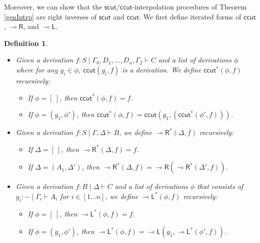\documentclass[sn-mathphys-num]{sn-jnl}%
\newcommand{\GG}{\Gamma}
\newcommand{\GD}{\Delta}
\newcommand{\vd}{\vdash}
\newcommand{\lolli}{\multimap}
\newcommand{\lleft}{{\lolli}\mathsf{L}}
\newcommand{\lright}{{\lolli}\mathsf{R}}
\newcommand{\sls}{\slash}
\newcommand{\mf}[1]{\mathsf{#1}}
\theoremstyle{thmstyleone}%
\theoremstyle{thmstyletwo}%
\theoremstyle{thmstylethree}%
\newtheorem{definition}[theorem]{Definition}%
\begin{document}
Moreover, we can show that the $\mf{scut}\sls \mf{ccut}$-interpolation procedures of Theorem \ref{genIntrp} are right inverses of $\mf{scut}$ and $\mf{ccut}$.
We first define iterated forms of $\mf{ccut}$, $\lright$, and $\lleft$.
\begin{definition}
~
\begin{itemize}
  \item  Given a derivation $f : S \mid \GG_0 , D_1 , \dots, D_n , \GG_2 \vd C$ and a list of derivations $\phi$ where for any $g_i \in \phi$, $\mf{ccut}(g_i , f)$ is a derivation. 
  We define $\mf{ccut}^* (\phi , f)$ recursively:
  \begin{itemize}
    \item[--] If $\phi = [\ ]$, then $\mf{ccut}^* (\phi , f) = f$.
    \item[--] If $\phi = (g_1 , \phi')$, then $\mf{ccut}^* (\phi , f) = \mf{ccut} (g_1 , (\mf{ccut}^* (\phi' , f)))$.
  \end{itemize}
  \item Given a derivation $f : S \mid \GG , \GD \vd B$, we define $\lright^* (\GD , f)$ recursively:
  \begin{itemize}
    \item If $\GD = [\ ]$, then $\lright^* (\GD, f) = f$.
    \item If $\GD = (A_1 , \GD')$, then $\lright^* (\GD , f) = \lright (\lright^* (\GD' , f))$.
  \end{itemize}
  \item Given a derivation $f : B \mid \GD \vd C$ and a list of derivations $\phi$ that consists of $g_i : {-} \mid \GG_i \vd A_i$ for $i \in [1 \dots n]$, we define $\lleft^* (\phi , f)$ recursively:
  \begin{itemize}
    \item If $\phi = [\ ]$, then $\lleft^* (\phi , f) = f$.
    \item If $\phi = (g_1 , \phi')$, then $\lleft^* (\phi , f) = \lleft (g_1 , \lleft^* (\phi' , f))$.
  \end{itemize}
\end{itemize}
\end{definition}
\end{document}
